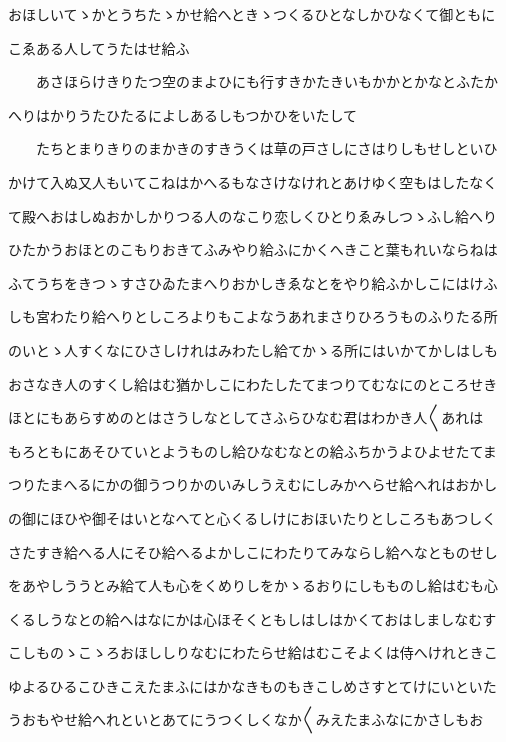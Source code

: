 \documentclass[a4paper,11pt,landscape]{ltjtarticle}
\begin{document}
\par\medskip
おほしいてゝかとうちたゝかせ給へときゝつくるひとなしかひなくて御ともに
\par\medskip
こゑある人してうたはせ給ふ
\par\medskip
　　あさほらけきりたつ空のまよひにも行すきかたきいもかかとかなとふたか
\par\medskip
へりはかりうたひたるによしあるしもつかひをいたして
\par\medskip
　　たちとまりきりのまかきのすきうくは草の戸さしにさはりしもせしといひ
\par\medskip
かけて入ぬ又人もいてこねはかへるもなさけなけれとあけゆく空もはしたなく
\par\medskip
て殿へおはしぬおかしかりつる人のなこり恋しくひとりゑみしつゝふし給へり
\par\medskip
ひたかうおほとのこもりおきてふみやり給ふにかくへきこと葉もれいならねは
\par\medskip
ふてうちをきつゝすさひゐたまへりおかしきゑなとをやり給ふかしこにはけふ
\par\medskip
しも宮わたり給へりとしころよりもこよなうあれまさりひろうものふりたる所
\par\medskip
のいとゝ人すくなにひさしけれはみわたし給てかゝる所にはいかてかしはしも
\par\medskip
おさなき人のすくし給はむ猶かしこにわたしたてまつりてむなにのところせき
\par\medskip
ほとにもあらすめのとはさうしなとしてさふらひなむ君はわかき人〱あれは
\par\medskip
もろともにあそひていとようものし給ひなむなとの給ふちかうよひよせたてま
\par\medskip
つりたまへるにかの御うつりかのいみしうえむにしみかへらせ給へれはおかし
\par\medskip
の御にほひや御そはいとなへてと心くるしけにおほいたりとしころもあつしく
\par\medskip
さたすき給へる人にそひ給へるよかしこにわたりてみならし給へなとものせし
\par\medskip
をあやしううとみ給て人も心をくめりしをかゝるおりにしもものし給はむも心
\par\medskip
くるしうなとの給へはなにかは心ほそくともしはしはかくておはしましなむす
\par\medskip
こしものゝこゝろおほししりなむにわたらせ給はむこそよくは侍へけれときこ
\par\medskip
ゆよるひるこひきこえたまふにはかなきものもきこしめさすとてけにいといた
\par\medskip
うおもやせ給へれといとあてにうつくしくなか〱みえたまふなにかさしもお
\end{document}
